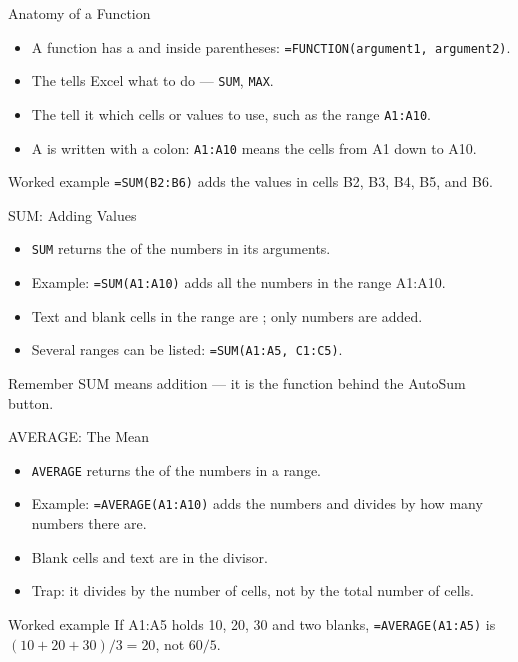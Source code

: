 \documentclass[aspectratio=169]{beamer}
\begin{document}
\begin{frame}{Anatomy of a Function}
  \begin{itemize}
    \item A function has a  and  inside parentheses:
      \texttt{=FUNCTION(argument1, argument2)}.
    \item The  tells Excel what to do --- \texttt{SUM},
      \texttt{MAX}.
    \item The  tell it which cells or values to use, such as
      the range \texttt{A1:A10}.
    \item A  is written with a colon: \texttt{A1:A10} means the
      cells from A1 down to A10.
  \end{itemize}
  \begin{exampleblock}{Worked example}
    \texttt{=SUM(B2:B6)} adds the values in cells B2, B3, B4, B5, and B6.
  \end{exampleblock}
\end{frame}

\begin{frame}{SUM: Adding Values}
  \begin{itemize}
    \item \texttt{SUM} returns the  of the numbers in its
      arguments.
    \item Example: \texttt{=SUM(A1:A10)} adds all the numbers in the range
      A1:A10.
    \item Text and blank cells in the range are ; only numbers
      are added.
    \item Several ranges can be listed: \texttt{=SUM(A1:A5, C1:C5)}.
  \end{itemize}
  \begin{block}{Remember}
    SUM means addition --- it is the function behind the AutoSum button.
  \end{block}
\end{frame}

\begin{frame}{AVERAGE: The Mean}
  \begin{itemize}
    \item \texttt{AVERAGE} returns the  of the numbers
      in a range.
    \item Example: \texttt{=AVERAGE(A1:A10)} adds the numbers and divides by
      how many numbers there are.
    \item Blank cells and text are  in the divisor.
    \item Trap: it divides by the number of  cells, not by the
      total number of cells.
  \end{itemize}
  \begin{exampleblock}{Worked example}
    If A1:A5 holds 10, 20, 30 and two blanks, \texttt{=AVERAGE(A1:A5)} is
    $(10+20+30)/3 = 20$, not $60/5$.
  \end{exampleblock}
\end{frame}
\end{document}
